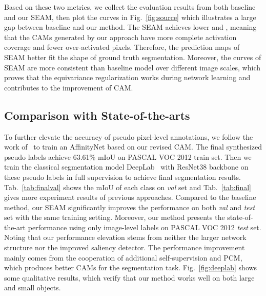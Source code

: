 \documentclass[10pt,twocolumn,letterpaper]{article}
\begin{document}
	Based on these two metrics, we collect the evaluation results from both baseline and our SEAM, then plot the curves in Fig.~\ref{fig:source} which illustrates a large gap between baseline and our method. The SEAM achieves lower  and , meaning that the CAMs generated by our approach have more complete activation coverage and fewer over-activated pixels. Therefore, the prediction maps of SEAM better fit the shape of ground truth segmentation. Moreover, the curves of SEAM are more consistent than baseline model over different image scales, which proves that the equivariance regularization works during network learning and contributes to the improvement of CAM.
	
	\subsection{Comparison with State-of-the-arts}
	To further elevate the accuracy of pseudo pixel-level annotations, we follow the work of~\cite{AffinityNet} to train an AffinityNet based on our revised CAM. The final synthesized pseudo labels achieve 63.61\% mIoU on PASCAL VOC 2012 train set. Then we train the classical segmentation model DeepLab~\cite{DeepLabv1} with ResNet38 backbone on these pseudo labels in full supervision to achieve final segmentation results. Tab.~\ref{tab:finalval} shows the mIoU of each class on \textit{val} set and Tab.~\ref{tab:final} gives more experiment results of previous approaches. Compared to the baseline method, our SEAM significantly improves the performance on both \textit{val} and \textit{test} set with the same training setting. Moreover, our method presents the state-of-the-art performance using only image-level labels on PASCAL VOC 2012 \textit{test} set. Noting that our performance elevation stems from neither the larger network structure nor the improved saliency detector. The performance improvement mainly comes from the cooperation of additional self-supervision and PCM, which produces better CAMs for the segmentation task. Fig.~\ref{fig:deeplab} shows some qualitative results, which verify that our method works well on both large and small objects. 
	
\end{document}
